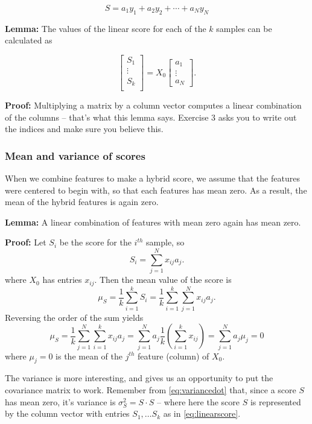\documentclass[
]{article}
\begin{document}
\[
S = a_{1}y_{1}+a_{2}y_{2}+\cdots+a_{N}y_{N}
\]

\textbf{Lemma:} The values of the linear score for each of the \(k\)
samples can be calculated as

\begin{equation}
\left[\begin{matrix} S_{1} \\ \vdots \\ S_{k}\\ \end{matrix}\right] =
X_{0}\left[
\begin{matrix} a_{1} \\ \vdots \\ a_{N}\end{matrix}\right].
\label{eq:linearscore}\end{equation}

\textbf{Proof:} Multiplying a matrix by a column vector computes a
linear combination of the columns -- that's what this lemma says.
Exercise 3 asks you to write out the indices and make sure you believe
this.

\hypertarget{mean-and-variance-of-scores}{%
\subsubsection{Mean and variance of
scores}\label{mean-and-variance-of-scores}}

When we combine features to make a hybrid score, we assume that the
features were centered to begin with, so that each features has mean
zero. As a result, the mean of the hybrid features is again zero.

\textbf{Lemma:} A linear combination of features with mean zero again
has mean zero.

\textbf{Proof:} Let \(S_{i}\) be the score for the \(i^{th}\) sample, so
\[
S_{i} = \sum_{j=1}^{N} x_{ij}a_{j}.
\] where \(X_{0}\) has entries \(x_{ij}\). Then the mean value of the
score is \[
\mu_{S} = \frac{1}{k}\sum_{i=1}^{k} S_{i} = \frac{1}{k}\sum_{i=1}^{k}\sum_{j=1}^{N} x_{ij}a_{j}.
\] Reversing the order of the sum yields \[
\mu_{S} = \frac{1}{k}\sum_{j=1}^{N}\sum_{i=1}^{k} x_{ij}a_{j} = \sum_{j=1}^{N} a_{j}\frac{1}{k}(\sum_{i=1}^{k} x_{ij})=
\sum_{j=1}^{N}a_{j}\mu_{j}=0
\] where \(\mu_{j}=0\) is the mean of the \(j^{th}\) feature (column) of
\(X_{0}\).

The variance is more interesting, and gives us an opportunity to put the
covariance matrix to work. Remember from \ref{eq:variancedot} that,
since a score \(S\) has mean zero, it's variance is
\(\sigma_{S}^2=S\cdot S\) -- where here the score \(S\) is represented
by the column vector with entries \(S_{1},\ldots S_{k}\) as in
\cref{eq:linearscore}.
\end{document}
